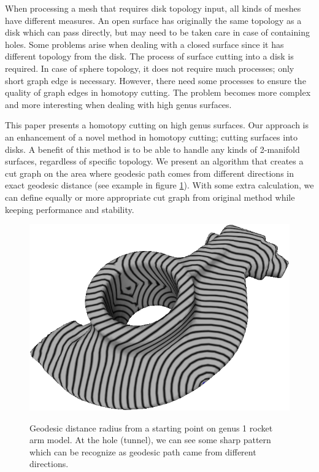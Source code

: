 \documentclass[a4paper,twoside]{article}
\begin{document}
When processing a mesh that requires disk topology input, all kinds of meshes have different measures. An open surface has originally the same topology as a disk which can pass directly, but may need to be taken care in case of containing holes. Some problems arise when dealing with a closed surface since it has different topology from the disk. The process of surface cutting into a disk is required. In case of sphere topology, it does not require much processes; only short graph edge is necessary. However, there need some processes to ensure the quality of graph edges in homotopy cutting. The problem becomes more complex and more interesting when dealing with high genus surfaces. 
   
This paper presents a homotopy cutting on high genus surfaces. Our approach is an enhancement of a novel method \cite{Gu:2002:GI:566654.566589} in homotopy cutting; cutting surfaces into disks. A benefit of this method is to be able to handle any kinds of 2-manifold surfaces, regardless of specific topology. We present an algorithm that creates a cut graph on the area where geodesic path comes from different directions in exact geodesic distance \cite{Mitchell:1987:DGP:33367.33372,Surazhsky:2005:FEA:1073204.1073228} (see example in figure \ref{fig:geodesic rocket arm}). With some extra calculation,  we can define equally or more appropriate cut graph from original method while keeping performance and stability.
\begin{figure}[!h]
	\centering
	{\includegraphics[width=0.74\columnwidth]{images/geodesic_rocket-arm.png}}
	\caption{Geodesic distance radius from a starting point on genus 1 rocket arm model. At the hole (tunnel), we can see some sharp pattern which can be recognize as geodesic path came from different directions.}
	\label{fig:geodesic rocket arm}
\end{figure}
\end{document}
